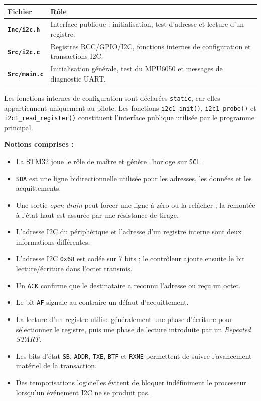 \documentclass[11pt,a4paper]{article}
\begin{document}
\begin{sessionbox}
		\begin{center}
			\begin{tabular}{>{\bfseries}p{4cm}p{9cm}}
				\toprule
				Fichier & Rôle \\
				\midrule
				\texttt{Inc/i2c.h} & Interface publique : initialisation, test d'adresse et lecture d'un registre. \\
				\texttt{Src/i2c.c} & Registres RCC/GPIO/I2C, fonctions internes de configuration et transactions I2C. \\
				\texttt{Src/main.c} & Initialisation générale, test du MPU6050 et messages de diagnostic UART. \\
				\bottomrule
			\end{tabular}
		\end{center}
		
		Les fonctions internes de configuration sont déclarées \texttt{static}, car elles appartiennent uniquement au pilote. Les fonctions \texttt{i2c1\_init()}, \texttt{i2c1\_probe()} et \texttt{i2c1\_read\_register()} constituent l'interface publique utilisée par le programme principal.
		
		\vspace{0.3cm}
		
		\textbf{Notions comprises :}
		
		\begin{itemize}
			\item La STM32 joue le rôle de maître et génère l'horloge sur \texttt{SCL}.
			\item \texttt{SDA} est une ligne bidirectionnelle utilisée pour les adresses, les données et les acquittements.
			\item Une sortie \textit{open-drain} peut forcer une ligne à zéro ou la relâcher ; la remontée à l'état haut est assurée par une résistance de tirage.
			\item L'adresse I2C du périphérique et l'adresse d'un registre interne sont deux informations différentes.
			\item L'adresse I2C \texttt{0x68} est codée sur 7 bits ; le contrôleur ajoute ensuite le bit lecture/écriture dans l'octet transmis.
			\item Un \texttt{ACK} confirme que le destinataire a reconnu l'adresse ou reçu un octet.
			\item Le bit \texttt{AF} signale au contraire un défaut d'acquittement.
			\item La lecture d'un registre utilise généralement une phase d'écriture pour sélectionner le registre, puis une phase de lecture introduite par un \textit{Repeated START}.
			\item Les bits d'état \texttt{SB}, \texttt{ADDR}, \texttt{TXE}, \texttt{BTF} et \texttt{RXNE} permettent de suivre l'avancement matériel de la transaction.
			\item Des temporisations logicielles évitent de bloquer indéfiniment le processeur lorsqu'un événement I2C ne se produit pas.
		\end{itemize}
		

\end{sessionbox}
\end{document}
